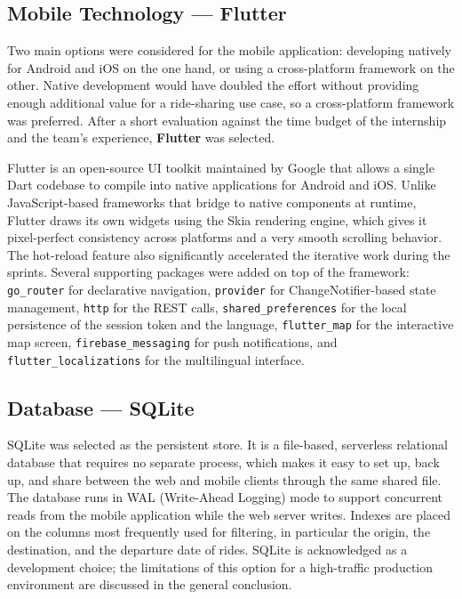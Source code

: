 \subsection{Mobile Technology --- Flutter}

Two main options were considered for the mobile application: developing natively for Android and iOS on the one hand, or using a cross-platform framework on the other. Native development would have doubled the effort without providing enough additional value for a ride-sharing use case, so a cross-platform framework was preferred. After a short evaluation against the time budget of the internship and the team's experience, \textbf{Flutter} was selected.

Flutter is an open-source UI toolkit maintained by Google that allows a single Dart codebase to compile into native applications for Android and iOS. Unlike JavaScript-based frameworks that bridge to native components at runtime, Flutter draws its own widgets using the Skia rendering engine, which gives it pixel-perfect consistency across platforms and a very smooth scrolling behavior. The hot-reload feature also significantly accelerated the iterative work during the sprints. Several supporting packages were added on top of the framework: \texttt{go\_router} for declarative navigation, \texttt{provider} for ChangeNotifier-based state management, \texttt{http} for the REST calls, \texttt{shared\_preferences} for the local persistence of the session token and the language, \texttt{flutter\_map} for the interactive map screen, \texttt{firebase\_messaging} for push notifications, and \texttt{flutter\_localizations} for the multilingual interface.

\subsection{Database --- SQLite}

SQLite was selected as the persistent store. It is a file-based, serverless relational database that requires no separate process, which makes it easy to set up, back up, and share between the web and mobile clients through the same shared file. The database runs in WAL (Write-Ahead Logging) mode to support concurrent reads from the mobile application while the web server writes. Indexes are placed on the columns most frequently used for filtering, in particular the origin, the destination, and the departure date of rides. SQLite is acknowledged as a development choice; the limitations of this option for a high-traffic production environment are discussed in the general conclusion.

